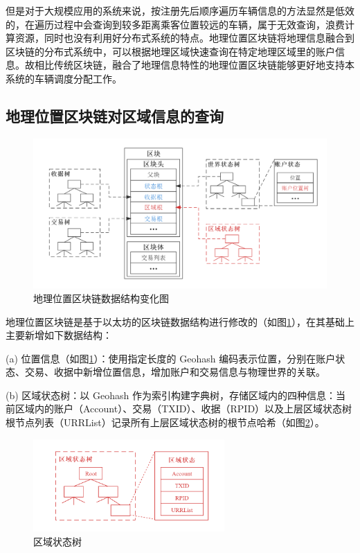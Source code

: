 但是对于大规模应用的系统来说，按注册先后顺序遍历车辆信息的方法显然是低效的，在遍历过程中会查询到较多距离乘客位置较远的车辆，属于无效查询，浪费计算资源，同时也没有利用好分布式系统的特点。地理位置区块链将地理信息融合到区块链的分布式系统中，可以根据地理区域快速查询在特定地理区域里的账户信息。故相比传统区块链，融合了地理信息特性的地理位置区块链能够更好地支持本系统的车辆调度分配工作。

\subsection{地理位置区块链对区域信息的查询}

\begin{figure}[h]
  \centering
  \includegraphics[width=1.0\textwidth]{figures/地理位置区块链}
  \caption{地理位置区块链数据结构变化图}\label{fig:treeBlockchain}
\end{figure}

地理位置区块链是基于以太坊的区块链数据结构进行修改的（如图\ref{fig:treeBlockchain}），在其基础上主要新增如下数据结构：

(a) 位置信息（如图\ref{fig:treeBlockchain}）：使用指定长度的 Geohash 编码表示位置，分别在账户状态、交易、收据中新增位置信息，增加账户和交易信息与物理世界的关联。

(b) 区域状态树：以 Geohash 作为索引构建字典树，存储区域内的四种信息：当前区域内的账户（Account）、交易（TXID）、收据（RPID）以及上层区域状态树根节点列表（URRList）记录所有上层区域状态树的根节点哈希（如图\ref{fig:regionState}）。

\begin{figure}[h]
  \centering
  \includegraphics[width=0.65\textwidth]{figures/区域状态树}
  \caption{区域状态树}\label{fig:regionState}
\end{figure}

